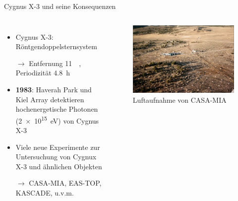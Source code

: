 \documentclass[aspectratio=1610, professionalfonts, 9pt, hyperref={colorlinks=false}]{beamer}
\begin{document}
\begin{frame}{Cygnus X-3 und seine Konsequenzen}
  \begin{columns}
      \begin{itemize}
        \setlength\itemsep{0.5em}
        \item Cygnus X-3: Röntgendoppelsternsystem
        \item[$\rightarrow$] Entfernung \SI{11}{\kilo\parsec}, Periodizität \SI{4.8}{\hour}
        \item \textbf{1983}: Haverah Park und Kiel Array detektieren hochenergetische Photonen (\SI{2e15}{\electronvolt}) von Cygnus X-3
        \item Viele neue Experimente zur Untersuchung von Cygnux X-3 und ähnlichen Objekten
        \item[$\rightarrow$] CASA-MIA, EAS-TOP, KASCADE, u.v.m.
      \end{itemize}
        \vspace*{10px}
  
      \begin{figure}
          \centering
          \includegraphics[width=\linewidth]{images/casa-mia}
          \caption{Luftaufnahme von CASA-MIA \cite{casa-mia}}
      \end{figure}
  \end{columns}
\end{frame}
\end{document}
